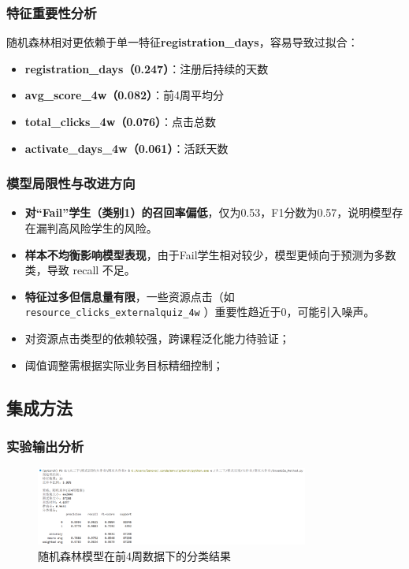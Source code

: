 \documentclass{SYSUReport}
\begin{document}
\subsubsection{特征重要性分析}
随机森林相对更依赖于单一特征\textbf{registration\_days}，容易导致过拟合：
\begin{itemize}
    \item \textbf{registration\_days（0.247）}：注册后持续的天数
    \item \textbf{avg\_score\_4w（0.082）}：前4周平均分
    \item \textbf{total\_clicks\_4w（0.076）}：点击总数
    \item \textbf{activate\_days\_4w（0.061）}：活跃天数
\end{itemize}

\subsubsection{模型局限性与改进方向}

\begin{itemize}
    \item \textbf{对“Fail”学生（类别1）的召回率偏低}，仅为0.53，F1分数为0.57，说明模型存在漏判高风险学生的风险。
    \item \textbf{样本不均衡影响模型表现}，由于Fail学生相对较少，模型更倾向于预测为多数类，导致 recall 不足。
    \item \textbf{特征过多但信息量有限}，一些资源点击（如 \texttt{resource\_clicks\_externalquiz\_4w}
）重要性趋近于0，可能引入噪声。
    \item 对资源点击类型的依赖较强，跨课程泛化能力待验证；
    \item 阈值调整需根据实际业务目标精细控制；
\end{itemize}


\subsection{集成方法}

\subsubsection{实验输出分析}

\begin{figure}[htbp]
\centering
\includegraphics[width=0.8\textwidth]{figures/ensemble_method_result.png}
\caption{随机森林模型在前4周数据下的分类结果}
\label{fig:ensemble_method_result}
\end{figure}
\end{document}
